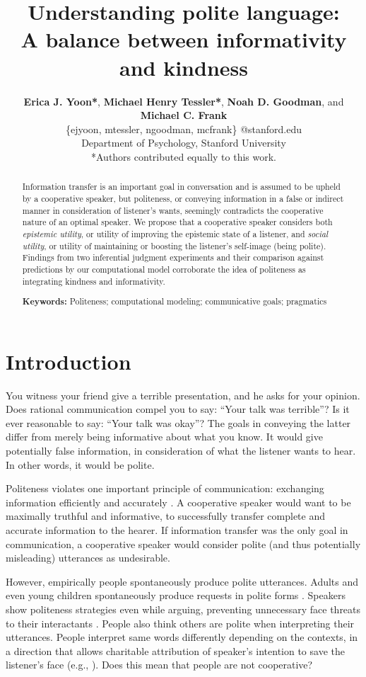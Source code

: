 \documentclass[10pt,letterpaper]{article}
\title{Understanding polite language: \\
A balance between informativity and kindness}
\author{ {\large \bf Erica J. Yoon*}, {\large \bf Michael Henry Tessler*}, {\large \bf Noah D. Goodman}, and {\large \bf Michael C. Frank}   \\
\{ejyoon, mtessler, ngoodman, mcfrank\} @stanford.edu \\ 
  Department of Psychology, Stanford University \\
  *Authors contributed equally to this work.}
\newcommand{\ndg}[1]{\textcolor{Green}{[ndg: #1]}}
\begin{document}
\maketitle


\begin{abstract}

Information transfer is an important goal in conversation
and is assumed to be upheld by a cooperative speaker,
but politeness, or conveying information in a false or indirect manner in consideration of listener's wants,
seemingly contradicts the cooperative nature of an optimal speaker. 
We propose that a cooperative speaker considers both
\emph{epistemic utility}, or utility of improving the epistemic state of a listener, 
and \emph{social utility}, or utility of maintaining or boosting the listener's self-image (being polite). 
Findings from two inferential judgment experiments 
and their comparison against predictions by our computational model corroborate 
the idea of politeness as integrating kindness and informativity.

\textbf{Keywords:} 
Politeness; computational modeling; communicative goals; pragmatics

\end{abstract}


\section{Introduction}
You witness your friend give a terrible presentation, and he asks for your opinion. 
Does rational communication compel you to say: ``Your talk was terrible''?
Is it ever reasonable to say: ``Your talk was okay''?
The goals in conveying the latter differ from merely being informative about what you know. 
It would give potentially false information, in consideration of what the listener wants to hear.
In other words, it would be polite.

Politeness violates one important principle of communication: exchanging information efficiently and accurately \cite{Grice1975}. 
A cooperative speaker would want to be maximally truthful and informative, to successfully transfer complete and accurate information to the hearer. 
If information transfer was the only goal in communication, a cooperative speaker would consider polite (and thus potentially misleading) utterances as undesirable. 

However, empirically people spontaneously produce polite utterances.
Adults and even young children spontaneously produce requests in polite forms \cite{clark1980, axia1985}. 
Speakers show politeness strategies even while arguing, preventing unnecessary face threats to their interactants \cite{holtgraves1997}.
People also think others are polite when interpreting their utterances. 
People interpret same words differently depending on the contexts, in a direction that allows charitable attribution of speaker's intention to save the listener's face (e.g., ). 
Does this mean that people are not cooperative? 
\end{document}
